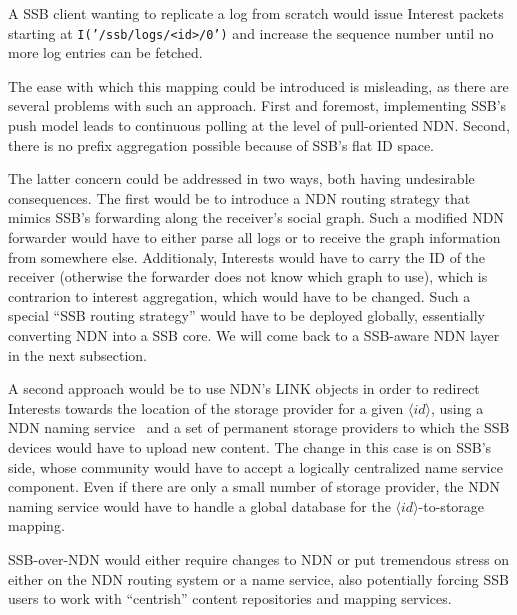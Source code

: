 \documentclass[10pt,sigconf,rewiew]{acmart}
\begin{document}
A SSB client wanting to replicate a log from scratch would issue
Interest packets starting at {\tt I('/ssb/logs/<id>/0')} and increase the
sequence number until no more log entries can be fetched.

The ease with which this mapping could be introduced is misleading, as
there are several problems with such an approach. First and foremost,
implementing SSB's push model leads to continuous polling at the level
of pull-oriented NDN. Second, there is no prefix aggregation possible
because of SSB's flat ID space.

The latter concern could be addressed in two ways, both having
undesirable consequences. The first would be to introduce a NDN
routing strategy that mimics SSB's forwarding along the receiver's
social graph. Such a modified NDN forwarder would have to either parse
all logs or to receive the graph information from somewhere
else. Additionaly, Interests would have to carry the ID of the
receiver (otherwise the forwarder does not know which graph to use),
which is contrarion to interest aggregation, which would have to be
changed.  Such a special ``SSB routing strategy'' would have to be
deployed globally, essentially converting NDN into a SSB core. We will
come back to a SSB-aware NDN layer in the next subsection.

A second approach would be to use NDN's LINK objects in order to redirect
Interests towards the location of the storage provider for a given
$\langle id\rangle$, using a NDN naming service~\cite{DBLP:conf/icccn/AfanasyevJYTXM017} and a set of
permanent storage providers to which the SSB devices would
have to upload new content.
The change in this case is on SSB's side,
whose community would have to accept a logically centralized name
service component.
Even if there are only a small number of storage provider,
the NDN naming service would have to
handle a global database for the $\langle id\rangle$-to-storage
mapping.


SSB-over-NDN would either require changes to NDN or put tremendous
stress on either on the NDN routing system or a name service, also
potentially forcing SSB users to work with ``centrish'' content
repositories and mapping services.
\end{document}
